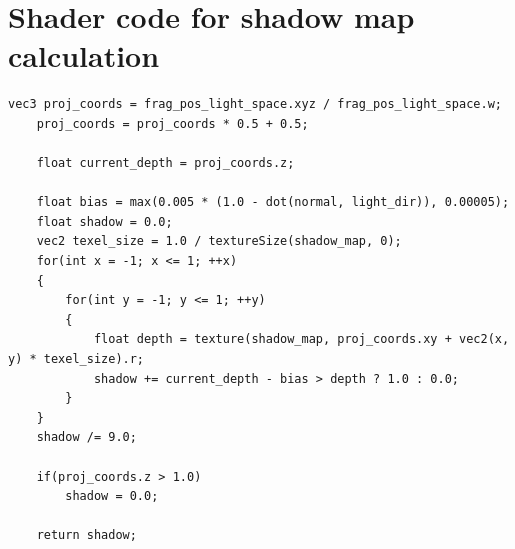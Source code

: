 \documentclass{article}
\begin{document}
	\section{Shader code for shadow map calculation}
	\label{appendix:shadow}
		
	\begin{lstlisting}[basicstyle=\ttfamily\footnotesize, tabsize=4]
	vec3 proj_coords = frag_pos_light_space.xyz / frag_pos_light_space.w;
	proj_coords = proj_coords * 0.5 + 0.5;

	float current_depth = proj_coords.z;
	
	float bias = max(0.005 * (1.0 - dot(normal, light_dir)), 0.00005);
	float shadow = 0.0;
	vec2 texel_size = 1.0 / textureSize(shadow_map, 0);
	for(int x = -1; x <= 1; ++x)
	{
		for(int y = -1; y <= 1; ++y)
		{
			float depth = texture(shadow_map, proj_coords.xy + vec2(x, y) * texel_size).r; 
			shadow += current_depth - bias > depth ? 1.0 : 0.0;        
		}
	}
	shadow /= 9.0;
	
	if(proj_coords.z > 1.0)
		shadow = 0.0;
	
	return shadow;
		
	\end{lstlisting}
  	
\end{document}
